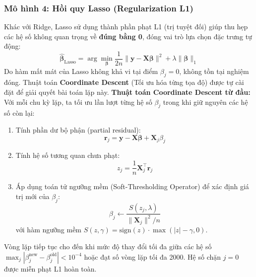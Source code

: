 \documentclass[12pt,a4paper]{article}
\begin{document}
\subsubsection{Mô hình 4: Hồi quy Lasso (Regularization L1)}
Khác với Ridge, Lasso sử dụng thành phần phạt L1 (trị tuyệt đối) giúp thu hẹp các hệ số không quan trọng về \textbf{đúng bằng 0}, đóng vai trò lựa chọn đặc trưng tự động:
\begin{equation}
    \hat{\boldsymbol{\beta}}_{\text{Lasso}} = \arg\min_{\boldsymbol{\beta}} \frac{1}{2n}\| \mathbf{y} - \mathbf{X}\boldsymbol{\beta} \|^2 + \lambda \|\boldsymbol{\beta}\|_1
\end{equation}
Do hàm mất mát của Lasso không khả vi tại điểm $\beta_j = 0$, không tồn tại nghiệm đóng. Thuật toán \textbf{Coordinate Descent} (Tối ưu hóa từng tọa độ) được tự cài đặt để giải quyết bài toán lặp này.
\textbf{Thuật toán Coordinate Descent từ đầu:}
Với mỗi chu kỳ lặp, ta tối ưu lần lượt từng hệ số $\beta_j$ trong khi giữ nguyên các hệ số còn lại:
\begin{enumerate}
    \item Tính phần dư bộ phận (partial residual):
    \begin{equation}
        \mathbf{r}_j = \mathbf{y} - \mathbf{X}\boldsymbol{\beta} + \mathbf{X}_j \beta_j
    \end{equation}
    \item Tính hệ số tương quan chưa phạt:
    \begin{equation}
        z_j = \frac{1}{n} \mathbf{X}_j^\top \mathbf{r}_j
    \end{equation}
    \item Áp dụng toán tử ngưỡng mềm (Soft-Thresholding Operator) để xác định giá trị mới của $\beta_j$:
    \begin{equation}
        \beta_j \leftarrow \frac{S(z_j, \lambda)}{\|\mathbf{X}_j\|^2 / n}
    \end{equation}
    với hàm ngưỡng mềm $S(z, \gamma) = \text{sign}(z) \cdot \max(|z| - \gamma, 0)$.
\end{enumerate}
Vòng lặp tiếp tục cho đến khi mức độ thay đổi tối đa giữa các hệ số $\max_j |\beta_j^{\text{new}} - \beta_j^{\text{old}}| < 10^{-4}$ hoặc đạt số vòng lặp tối đa 2000. Hệ số chặn $j=0$ được miễn phạt L1 hoàn toàn.
\end{document}
